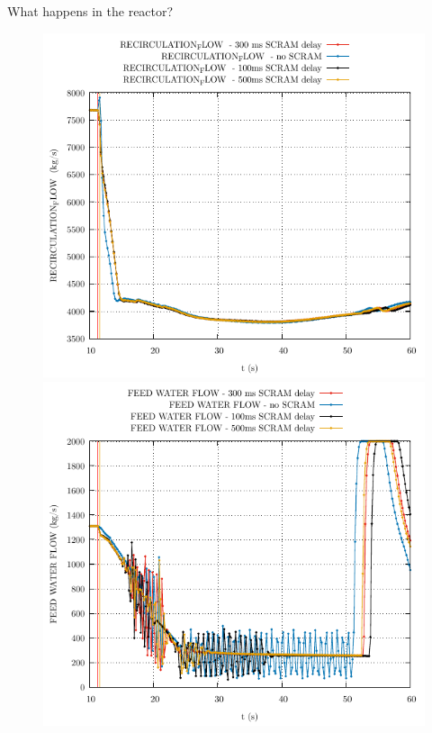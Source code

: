 \begin{frame}{What happens in the reactor?}
\begin{figure}
\begin{minipage}{.5\textwidth}
			\centering
			\includegraphics[width=0.7\linewidth]{./graphs/RECIRCULATION_FLOW _comp.pdf}
		\end{minipage}%
		\begin{minipage}{.5\textwidth}
			
			
					\centering
					\includegraphics[width=.7\linewidth]{./graphs/FEED WATER FLOW_comp.pdf}
		\end{minipage}
	\end{figure}
\end{frame}

